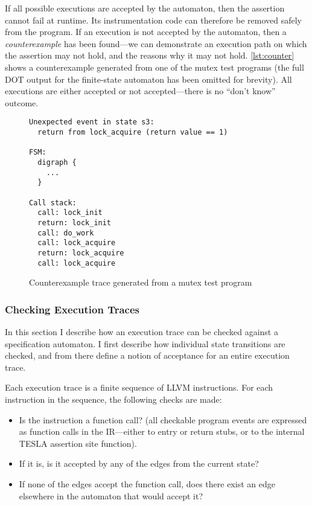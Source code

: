 If all possible executions are accepted by the automaton, then the assertion
cannot fail at runtime. Its instrumentation code can therefore be removed safely
from the program. If an execution is not accepted by the automaton, then a
\emph{counterexample} has been found---we can demonstrate an execution path on
which the assertion may not hold, and the reasons why it may not hold.
\autoref{lst:counter} shows a counterexample generated from one of the mutex
test programs (the full DOT output for the finite-state automaton has been
omitted for brevity). All executions are either accepted or not accepted---there
is no ``don't know'' outcome.

\begin{figure}
  \begin{verbatim}
Unexpected event in state s3:
  return from lock_acquire (return value == 1)

FSM:
  digraph {
    ...
  }

Call stack:
  call: lock_init
  return: lock_init
  call: do_work
  call: lock_acquire
  return: lock_acquire
  call: lock_acquire
  \end{verbatim}
  \caption{Counterexample trace generated from a mutex test program}
  \label{lst:counter}
\end{figure}

\subsubsection{Checking Execution Traces}

In this section I describe how an execution trace can be checked against a
specification automaton. I first describe how individual state transitions are
checked, and from there define a notion of acceptance for an entire execution
trace.

Each execution trace is a finite sequence of LLVM instructions. For each
instruction in the sequence, the following checks are made:
\begin{itemize}
  \item Is the instruction a function call? (all checkable program events are
    expressed as function calls in the IR---either to entry or return stubs, or
    to the internal TESLA assertion site function).
  \item If it is, is it accepted by any of the edges from the current state?
  \item If none of the edges accept the function call, does there exist an edge
    elsewhere in the automaton that would accept it?
\end{itemize}


